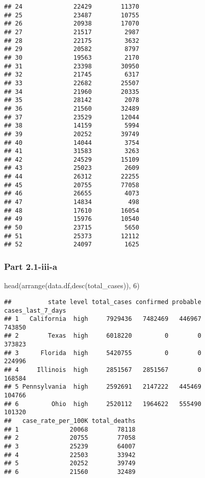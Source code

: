 \documentclass[
]{article}
\newenvironment{Shaded}{\begin{snugshade}}{\end{snugshade}}
\newcommand{\DecValTok}[1]{\textcolor[rgb]{0.00,0.00,0.81}{#1}}
\newcommand{\FunctionTok}[1]{\textcolor[rgb]{0.00,0.00,0.00}{#1}}
\newcommand{\NormalTok}[1]{#1}
\begin{document}
\begin{verbatim}
## 24              22429        11370
## 25              23487        10755
## 26              20938        17070
## 27              21517         2987
## 28              22175         3632
## 29              20582         8797
## 30              19563         2170
## 31              23398        30950
## 32              21745         6317
## 33              22682        25507
## 34              21960        20335
## 35              28142         2078
## 36              21560        32489
## 37              23529        12044
## 38              14159         5994
## 39              20252        39749
## 40              14044         3754
## 41              31583         3263
## 42              24529        15109
## 43              25023         2609
## 44              26312        22255
## 45              20755        77058
## 46              26655         4073
## 47              14834          498
## 48              17610        16054
## 49              15976        10540
## 50              23715         5650
## 51              25373        12112
## 52              24097         1625
\end{verbatim}

\hypertarget{part-2.1-iii-a}{%
\subsubsection{Part 2.1-iii-a}\label{part-2.1-iii-a}}

\begin{Shaded}
\begin{Highlighting}[]
\FunctionTok{head}\NormalTok{(}\FunctionTok{arrange}\NormalTok{(data.df,}\FunctionTok{desc}\NormalTok{(total\_cases)), }\DecValTok{6}\NormalTok{)}
\end{Highlighting}
\end{Shaded}

\begin{verbatim}
##          state level total_cases confirmed probable cases_last_7_days
## 1   California  high     7929436   7482469   446967            743850
## 2        Texas  high     6018220         0        0            373823
## 3      Florida  high     5420755         0        0            224996
## 4     Illinois  high     2851567   2851567        0            168584
## 5 Pennsylvania  high     2592691   2147222   445469            104766
## 6         Ohio  high     2520112   1964622   555490            101320
##   case_rate_per_100K total_deaths
## 1              20068        78118
## 2              20755        77058
## 3              25239        64007
## 4              22503        33942
## 5              20252        39749
## 6              21560        32489
\end{verbatim}
\end{document}
